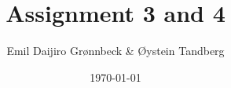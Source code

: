 \documentclass{article}
\begin{document}
\title{Assignment 3 and 4}
\author{Emil Daijiro Grønnbeck \& Øystein Tandberg}
\date{\today}
\maketitle



\end{document}
